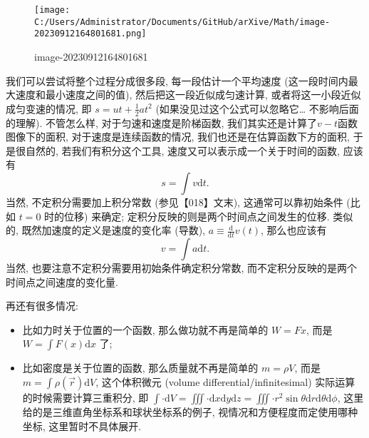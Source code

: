 \begin{figure}
\centering
\texttt{[image: C:/Users/Administrator/Documents/GitHub/arXive/Math/image-20230912164801681.png]}
\caption{image-20230912164801681}
\end{figure}

我们可以尝试将整个过程分成很多段, 每一段估计一个平均速度
(这一段时间内最大速度和最小速度之间的值), 然后把这一段近似成匀速计算,
或者将这一小段近似成匀变速的情况, 即 \(s=ut+\frac{1}{2}at^2\)
(如果没见过这个公式可以忽略它\ldots{} 不影响后面的理解). 不管怎么样,
对于匀速和速度是阶梯函数, 我们其实还是计算了\(v-t\)函数图像下的面积,
对于速度是连续函数的情况, 我们也还是在估算函数下方的面积, 于是很自然的,
若我们有积分这个工具, 速度又可以表示成一个关于时间的函数, 应该有 \[
s=\int v\mathrm{d}t.
\] 当然, 不定积分需要加上积分常数 (参见【018】文末),
这通常可以靠初始条件 (比如 \(t=0\) 时的位移) 来确定;
定积分反映的则是两个时间点之间发生的位移. 类似的,
既然加速度的定义是速度的变化率 (导数),
\(a\equiv \frac{\mathrm{d}}{\mathrm{d}t}v(t)\), 那么也应该有 \[
v=\int a\mathrm{d}t.
\] 当然, 也要注意不定积分需要用初始条件确定积分常数,
而不定积分反映的是两个时间点之间速度的变化量.

再还有很多情况:

\begin{itemize}
\tightlist
\item
  比如力时关于位置的一个函数, 那么做功就不再是简单的 \(W=Fx\), 而是
  \(W=\int F(x)\mathrm{d}x\) 了;
\item
  比如密度是关于位置的函数, 那么质量就不再是简单的 \(m=\rho V\), 而是
  \(m=\int \rho(\vec{r})\mathrm{d}V\), 这个体积微元 (volume
  differential/infinitesimal) 实际运算的时候需要计算三重积分, 即
  \(\int\cdot\mathrm{d}V=\iiint\cdot\mathrm{d}x\mathrm{d}y\mathrm{d}z=\iiint\cdot r^2\sin\theta\mathrm{d}r\mathrm{d}\theta\mathrm{d}\phi\),
  这里给的是三维直角坐标系和球状坐标系的例子,
  视情况和方便程度而定使用哪种坐标, 这里暂时不具体展开.
\end{itemize}
